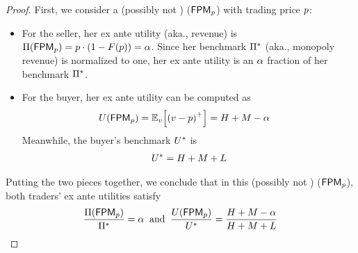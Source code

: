 \begin{proof}
    First, we consider a (possibly not {\ksfair}) {\FixPrice} ({${\sf FPM}_{p}$}) with trading price $p$:
    \begin{itemize}
        \item For the seller, her ex ante utility (aka., revenue) is $\Pi({\sf FPM}_{p}) = p\cdot (1 - F(p)) = \alpha$. Since her benchmark $\Pi^*$ (aka., monopoly revenue) is normalized to one, her ex ante utility is an $\alpha$ fraction of her benchmark $\Pi^*$.
        \item For the buyer, her ex ante utility can be computed as 
        \begin{align*}
            \buyerexanteutil(\FPM_{\price}) &= 
            \expect[\val]{\plus{\val - \price}} = 
            H + M - \revratio
        \end{align*}
        Meanwhile, the buyer's benchmark $U^*$ is 
        \begin{align*}
            U^* = H + M + L
        \end{align*}
    \end{itemize}
    Putting the two pieces together, we conclude that in this (possibly not {\ksfair}) {\FixPrice} ({${\sf FPM}_{p}$}), both traders' ex ante utilities satisfy
    \begin{align*}
        \frac{\Pi({\sf FPM}_{p})}{\Pi^*} = \alpha
        \;\;
        \mbox{and}
        \;\;
        \frac{U({\sf FPM}_{p})}{U^*} = \frac{H + M - \alpha}{H + M + L}
    \end{align*}
    

\end{proof}
